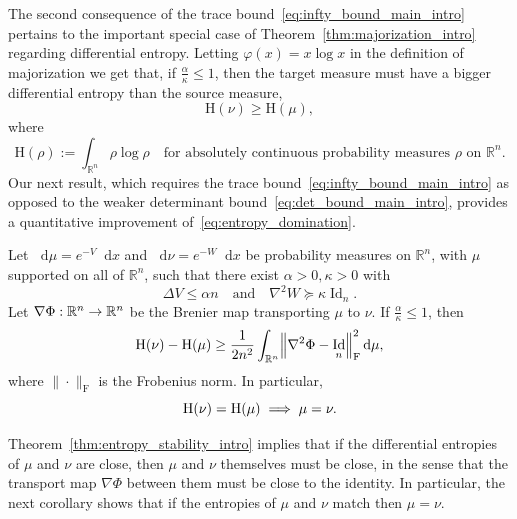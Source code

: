 \documentclass[AHL,Unicode,longabstracts]{cedram}
\newcommand{\R}{\mathbb R}
\DeclareMathOperator{\Id}{Id}
\newcommand{\Ent}{\mathrm H}
\newcommand{\V}{V}
\newcommand{\W}{W}
\newcommand{\dd}{n}
\newcommand{\prob}{\rho}
\newcommand{\source}{\mu}
\newcommand{\target}{\nu}
\newcommand{\lsh}{\alpha}
\newcommand{\lc}{\kappa}
\newcommand*\diff{\mathop{}\!\mathrm{d}}
\newcommand{\OT}{\Phi}
\newcommand{\cxfun}{\varphi}
\renewcommand*{\to}{\mathchoice{\longrightarrow}{\rightarrow}{\rightarrow}{\rightarrow}}
\renewcommand*{\implies}{\mathchoice{\Longrightarrow}{\Rightarrow}{\Rightarrow}{\Rightarrow}}
\let\originalleft\left
\let\originalright\right
\renewcommand{\left}{\mathopen{}\mathclose\bgroup\originalleft}
\renewcommand{\right}{\aftergroup\egroup\originalright}
\begin{document}
The second consequence of the trace bound~\eqref{eq:infty_bound_main_intro} pertains to the important special case of Theorem~\ref{thm:majorization_intro} regarding differential entropy. Letting $ \cxfun(x)=x\log x$ in the definition of majorization we get that, if $\frac{\lsh}{\lc}\le 1$, then the target measure must have a bigger differential entropy than the source measure,
\begin{equation}\label{eq:entropy_domination}
\Ent(\target)\ge \Ent(\source),
\end{equation}
where
\[
\Ent(\prob):=\int_{\R^{\dd}} \prob\log\prob\quad \text{for absolutely continuous probability measures $\prob$ on $\R^{\dd}$}.
\]
Our next result, which requires the trace bound~\eqref{eq:infty_bound_main_intro} as opposed to the weaker determinant bound~\eqref{eq:det_bound_main_intro}, provides a quantitative improvement of~\eqref{eq:entropy_domination}.

\begin{theo}\label{thm:entropy_stability_intro}
Let $\diff\source=e^{-\V}\diff x$ and $\diff\target=e^{-\W}\diff x$ be probability measures on $\R^{\dd}$, with $\source$ supported on all of $\R^{\dd}$, such that there exist $\lsh>0,\lc>0$ with
\[
\Delta \V \le \lsh\dd \quad\text{and}\quad \nabla^2\W \succeq \lc \Id_{\dd}.
\]
Let $\nabla\OT:\R^{\dd}\to\R^{\dd}$ be the Brenier map transporting $\source$ to $\target$. If $\frac{\lsh}{\lc}\le 1$, then
\[
\Ent(\target)- \Ent(\source) \ge \frac{1}{2\dd^2}\int_{\R^{\dd}}\left\|\nabla^2\OT-\Id_{\dd}\right\|_{\text{F}}^2\diff \source,
\]
where $\|\cdot\|_{\text{F}}$ is the Frobenius norm. In particular,
\begin{equation}\label{eq:entropy_eq}
\Ent(\target)= \Ent(\source)\;\implies \; \source=\target.
\end{equation}
\end{theo}

Theorem~\ref{thm:entropy_stability_intro} implies that if the differential entropies of $\source$ and $\target$ are close, then $\source$ and $\target$ themselves must be close, in the sense that the transport map $\nabla\OT$ between them must be close to the identity. In particular, the next corollary shows that if the entropies of $\source$ and $\target$ match then $\source=\target$.
\end{document}
